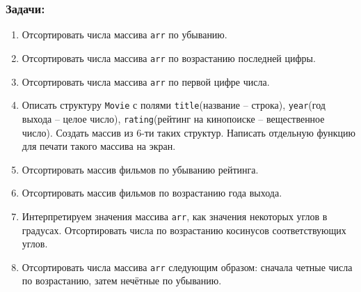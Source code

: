 \documentclass{article}
\begin{document}
\subsubsection*{Задачи:}
\begin{enumerate}
\item Отсортировать числа массива \texttt{arr} по убыванию.
\item Отсортировать числа массива \texttt{arr} по возрастанию последней цифры.
\item Отсортировать числа массива \texttt{arr} по первой цифре числа.
\item Описать структуру \texttt{Movie} с полями \texttt{title}(название -- строка), \texttt{year}(год выхода -- целое число), \texttt{rating}(рейтинг на кинопоиске -- вещественное число). Создать массив из 6-ти таких структур. Написать отдельную функцию для печати такого массива на экран.
\item Отсортировать массив фильмов по убыванию рейтинга. 
\item Отсортировать массив фильмов по возрастанию года выхода. 
\item Интерпретируем значения массива \texttt{arr}, как значения некоторых углов в градусах. Отсортировать числа по возрастанию косинусов соответствующих углов.
\item Отсортировать числа массива \texttt{arr} следующим образом: сначала четные числа по возрастанию, затем нечётные по убыванию.
\end{enumerate}

\fi
\end{document}
